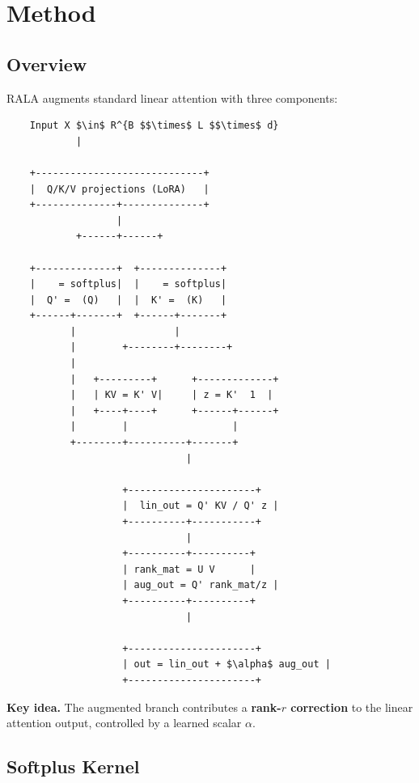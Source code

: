 
\section{Method}

\subsection{Overview}

RALA augments standard linear attention with three components:

\begin{lstlisting}
    Input X $\in$ R^{B $$\times$ L $$\times$ d}
            |
             
    +-----------------------------+
    |  Q/K/V projections (LoRA)   |
    +--------------+--------------+
                   |
            +------+------+
                           
    +--------------+  +--------------+
    |    = softplus|  |    = softplus|
    |  Q' =  (Q)   |  |  K' =  (K)   |
    +------+-------+  +------+-------+
           |                 |
           |        +--------+--------+
           |                           
           |   +---------+      +-------------+
           |   | KV = K' V|     | z = K'  1  |
           |   +----+----+      +------+------+
           |        |                  |
           +--------+----------+-------+
                               |
                                
                    +----------------------+
                    |  lin_out = Q' KV / Q' z |
                    +----------+-----------+
                               |
                    +----------+----------+
                    | rank_mat = U V      |
                    | aug_out = Q' rank_mat/z |
                    +----------+----------+
                               |
                                
                    +----------------------+
                    | out = lin_out + $\alpha$ aug_out |
                    +----------------------+
\end{lstlisting}

\textbf{Key idea.} The augmented branch contributes a \textbf{rank-$r$ correction} 
to the linear attention output, controlled by a learned scalar $\alpha$.

\subsection{Softplus Kernel}

